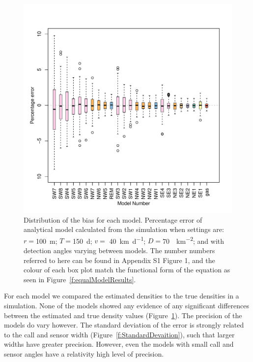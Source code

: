 \documentclass[a4paper,10pt,reqno,oneside]{amsart}
\begin{document}
\begin{figure}
	\centering
	\includegraphics[width=1\textwidth]{imgs/AverageModelBias.pdf}
	\caption{Distribution of the bias for each model. Percentage error of analytical model calculated from the simulation when settings are: $r = $\SI{100}{\meter}; $T = $\SI{150}{\day}; $v = $ \SI{40}{\kilo\meter\per\day}; $D=$\SI{70}{\animals\per\kilo\meter\squared}; and with detection angles varying between models. The number numbers referred to here can be found in Appendix S1 Figure 1, and the colour of each box plot match the functional form of the equation as seen in Figure~\ref{f:equalModelResults}.
  }
	\label{f:ModelBias}
\end{figure}

For each model we compared the estimated densities to the true densities in a simulation. None of the models showed any evidence of any significant differences between the estimated and true density values (Figure~\ref{f:ModelBias}). The precision of the models do vary however. The standard deviation of the error is strongly related to the call and sensor width (Figure~\ref{f:StandardDevaition}), such that larger widths have greater precision. However, even the models with small call and sensor angles have a relativity high level of precision. 
\end{document}
